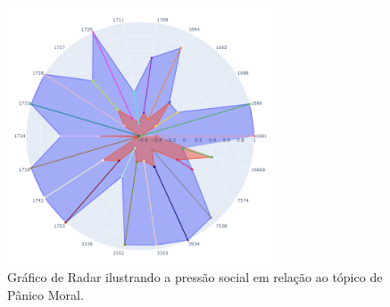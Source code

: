 \begin{figure}[htb]
	\centering
	\includegraphics[width=0.7\textwidth]{images/social_barometer_moral.png}
	\caption{Gráfico de Radar ilustrando a pressão social em relação ao tópico de Pânico Moral.}
	\label{fig:social_barometer_moral}
\end{figure}

